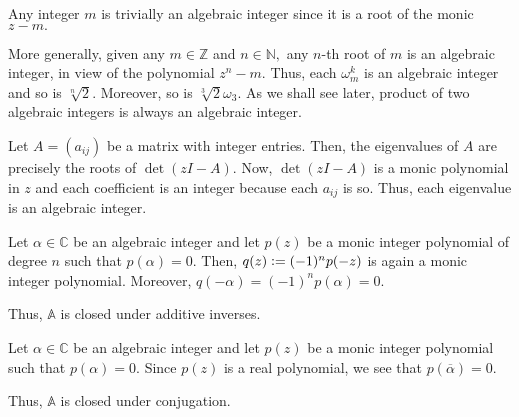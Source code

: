 \begin{ex}[Integers]
	Any integer $m$ is trivially an algebraic integer since it is a root of the monic $z - m.$
\end{ex}

\begin{ex}[$n$-th roots] \label{ex:nrootsalgint}
	More generally, given any $m \in \mathbb{Z}$ and $n \in \mathbb{N},$ any $n$-th root of $m$ is an algebraic integer, in view of the polynomial $z^n - m.$ Thus, each $\omega_m^k$ is an algebraic integer and so is $\sqrt[n]{2}.$ Moreover, so is $\sqrt[3]{2}\omega_3.$ As we shall see later, product of two algebraic integers is always an algebraic integer.
\end{ex}

\begin{ex} \label{ex:eigenintmatrix}
	Let $A = (a_{ij})$ be a matrix with integer entries. Then, the eigenvalues of $A$ are precisely the roots of $\det(zI - A).$ Now, $\det(zI - A)$ is a monic polynomial in $z$ and each coefficient is an integer because each $a_{ij}$ is so. Thus, each eigenvalue is an algebraic integer.
\end{ex}

\begin{ex}
	Let $\alpha \in \mathbb{C}$ be an algebraic integer and let $p(z)$ be a monic integer polynomial of degree $n$ such that $p(\alpha) = 0.$ Then, $q(z) \vcentcolon= (-1)^np(-z)$ is again a monic integer polynomial. Moreover, $q(-\alpha) = (-1)^np(\alpha) = 0.$

	Thus, $\mathbb{A}$ is closed under additive inverses.
\end{ex}

\begin{ex}
	Let $\alpha \in \mathbb{C}$ be an algebraic integer and let $p(z)$ be a monic integer polynomial such that $p(\alpha) = 0.$ Since $p(z)$ is a real polynomial, we see that $p(\overline{\alpha}) = 0.$

	Thus, $\mathbb{A}$ is closed under conjugation.
\end{ex}

